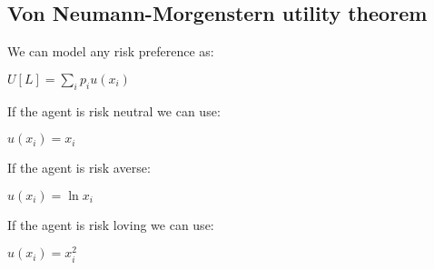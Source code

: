 
\subsection{Von Neumann-Morgenstern utility theorem}

We can model any risk preference as:

\(U[L]=\sum_i p_iu(x_i)\)

If the agent is risk neutral we can use:

\(u(x_i)=x_i\)

If the agent is risk averse:

\(u(x_i)=\ln x_i\)

If the agent is risk loving we can use:

\(u(x_i)=x_i^2\)

